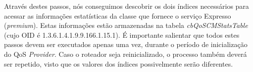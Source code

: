	Através destes passos, nós conseguimos descobrir os dois índices necessários para acessar as informações estatísticas da classe que fornece o serviço Expresso (\textit{premium}). Estas informações estão armazenadas na tabela \textit{cbQoSCMStatsTable} (cujo OID é 1.3.6.1.4.1.9.9.166.1.15.1). É importante salientar que todos estes passos devem ser executados apenas uma vez, durante o período de inicialização do QoS \textit{Provider}. Caso o roteador seja reinicializado, o processo também deverá ser repetido, visto que os valores dos índices possivelmente serão diferentes.